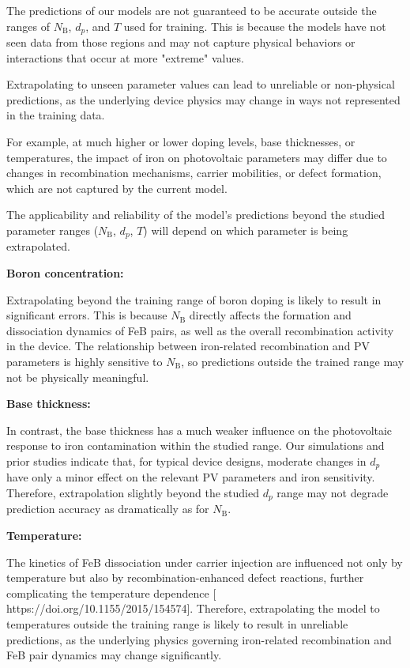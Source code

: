 \documentclass[a4paper,fleqn]{cas-sc}
\begin{document}
The predictions of our models are not guaranteed to be accurate outside the ranges of $N_\mathrm{B}$, $d_p$, and $T$ used for training. 
This is because the models have not seen data from those regions and may not capture physical behaviors or interactions that occur at more "extreme" values.


Extrapolating to unseen parameter values can lead to unreliable or non-physical predictions, as the underlying device physics may change in ways not represented in the training data.


For example, at much higher or lower doping levels, base thicknesses, or temperatures, the impact of iron on photovoltaic parameters may differ due to changes in recombination mechanisms, carrier mobilities, or defect formation, which are not captured by the current model.


The applicability and reliability of the model’s predictions beyond the studied parameter ranges ($N_\mathrm{B}$, $d_p$, $T$) will depend on which parameter is being extrapolated.


\textbf{Boron concentration:}

Extrapolating beyond the training range of boron doping is likely to result in significant errors. 
This is because $N_\mathrm{B}$ directly affects the formation and dissociation dynamics of FeB pairs, as well as the overall recombination activity in the device. 
The relationship between iron-related recombination and PV parameters is highly sensitive to $N_\mathrm{B}$, so predictions outside the trained range may not be physically meaningful.


\textbf{Base thickness:}

In contrast, the base thickness has a much weaker influence on the photovoltaic response to iron contamination within the studied range. 
Our simulations and prior studies indicate that, for typical device designs, moderate changes in $d_p$ have only a minor effect on the relevant PV parameters and iron sensitivity. 
Therefore, extrapolation slightly beyond the studied $d_p$ range may not degrade prediction accuracy as dramatically as for $N_\mathrm{B}$.


\textbf{Temperature:}

The kinetics of FeB dissociation under carrier injection are influenced not only by temperature but also by recombination-enhanced defect reactions, further complicating the temperature dependence [ https://doi.org/10.1155/2015/154574]. 
Therefore, extrapolating the model to temperatures outside the training range is likely to result in unreliable predictions, as the underlying physics governing iron-related recombination and FeB pair dynamics may change significantly.
\end{document}
